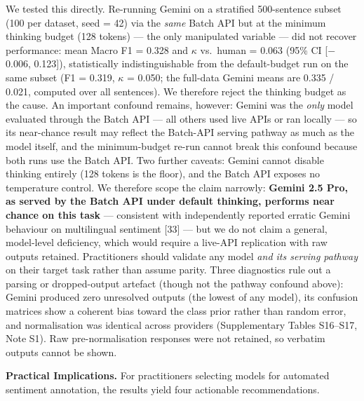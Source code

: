 \documentclass[11pt]{article}
\begin{document}
We tested this directly. Re-running Gemini on a stratified 500-sentence
subset (100 per dataset, seed = 42) via the \emph{same} Batch API but at
the minimum thinking budget (128 tokens) --- the only manipulated
variable --- did not recover performance: mean Macro F1 = 0.328 and $\kappa$
vs.~human = 0.063 (95\% CI {[}$-$0.006, 0.123{]}), statistically
indistinguishable from the default-budget run on the same subset (F1 =
0.319, $\kappa$ = 0.050; the full-data Gemini means are 0.335 / 0.021, computed
over all sentences). We therefore reject the thinking budget as the
cause. An important confound remains, however: Gemini was the
\emph{only} model evaluated through the Batch API --- all others used
live APIs or ran locally --- so its near-chance result may reflect the
Batch-API serving pathway as much as the model itself, and the
minimum-budget re-run cannot break this confound because both runs use
the Batch API. Two further caveats: Gemini cannot disable thinking
entirely (128 tokens is the floor), and the Batch API exposes no
temperature control. We therefore scope the claim narrowly:
\textbf{Gemini 2.5 Pro, as served by the Batch API under default
thinking, performs near chance on this task} --- consistent with
independently reported erratic Gemini behaviour on multilingual
sentiment {[}33{]} --- but we do not claim a general, model-level
deficiency, which would require a live-API replication with raw outputs
retained. Practitioners should validate any model \emph{and its serving
pathway} on their target task rather than assume parity. Three
diagnostics rule out a parsing or dropped-output artefact (though not
the pathway confound above): Gemini produced zero unresolved outputs
(the lowest of any model), its confusion matrices show a coherent bias
toward the class prior rather than random error, and normalisation was
identical across providers (Supplementary Tables S16--S17, Note S1). Raw
pre-normalisation responses were not retained, so verbatim outputs
cannot be shown.

\textbf{Practical Implications.} For practitioners selecting models for
automated sentiment annotation, the results yield four actionable
recommendations.
\end{document}
